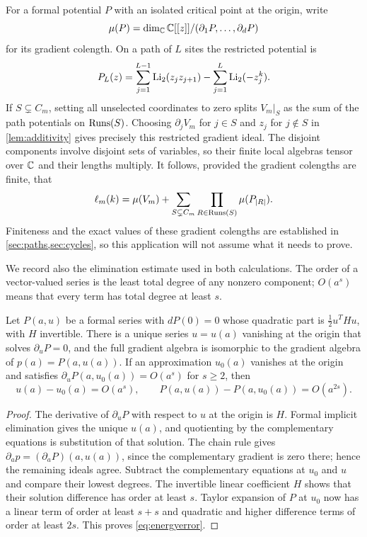 For a formal potential $P$ with an isolated critical point at the origin,
write
\[
 \mu(P)=\dim_\mathbb C\mathbb C[[z]]/(\partial_1P,\ldots,\partial_dP)
\]
for its gradient colength. On a path of $L$ sites the restricted potential is
\begin{equation}\label{eq:pathpotential}
 P_L(z)=\sum_{j=1}^{L-1}\operatorname{Li}_2(z_jz_{j+1})
             -\sum_{j=1}^L\operatorname{Li}_2(-z_j^k).
\end{equation}
If $S\subsetneq C_m$, setting all unselected coordinates to zero splits
$V_m|_S$ as the sum of the path potentials on $\operatorname{Runs}(S)$.
Choosing $\partial_jV_m$ for $j\in S$ and $z_j$ for $j\notin S$
in \cref{lem:additivity} gives precisely this restricted gradient ideal.
The disjoint components involve disjoint sets of variables, so their finite
local algebras tensor over $\mathbb C$ and their lengths multiply. It follows,
provided the gradient colengths are finite, that
\begin{equation}\label{eq:reductionlength}
 \ell_m(k)=\mu(V_m)
       +\sum_{S\subsetneq C_m}\prod_{R\in\operatorname{Runs}(S)}\mu(P_{|R|}).
\end{equation}
Finiteness and the exact values of these gradient colengths are established
in \cref{sec:paths,sec:cycles}, so this application will not assume what
it needs to prove.

We record also the elimination estimate used in both calculations. The
order of a vector-valued series is the least total degree of any nonzero
component; $O(a^s)$ means that every term has total degree at least $s$.

\begin{lemma}\label{lem:eliminate}
Let $P(a,u)$ be a formal series with $dP(0)=0$ whose quadratic part is
$\tfrac12u^THu$, with $H$ invertible. There is a unique series $u=u(a)$
vanishing at the origin that solves $\partial_uP=0$, and the full gradient
algebra is isomorphic to the gradient algebra of $p(a)=P(a,u(a))$.
If an approximation $u_0(a)$ vanishes at the origin and satisfies
$\partial_uP(a,u_0(a))=O(a^s)$ for $s\geq2$, then
\begin{equation}\label{eq:energyerror}
 u(a)-u_0(a)=O(a^s),\qquad
 P(a,u(a))-P(a,u_0(a))=O(a^{2s}).
\end{equation}
\end{lemma}

\begin{proof}
The derivative of $\partial_uP$ with respect to $u$ at the origin is $H$.
Formal implicit elimination gives the unique $u(a)$, and quotienting by
the complementary equations is substitution of that solution. The chain
rule gives $\partial_ap=(\partial_aP)(a,u(a))$, since the complementary
gradient is zero there; hence the remaining ideals agree. Subtract the
complementary equations at $u_0$ and $u$ and compare their lowest degrees.
The invertible linear coefficient $H$ shows that their solution difference
has order at least $s$. Taylor expansion of $P$ at $u_0$ now has a linear
term of order at least $s+s$ and quadratic and higher difference terms of
order at least $2s$. This proves \eqref{eq:energyerror}.
\end{proof}
